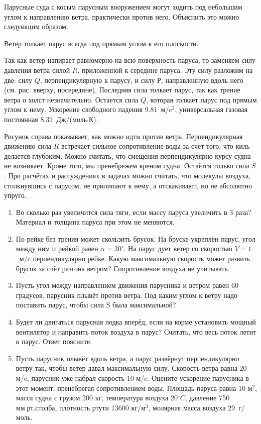 
Парусные суда с косым парусным вооружением могут ходить под небольшим углом к направлению ветра, 
практически против него. Объяснить это можно следующим образом.

Ветер толкает парус всегда под прямым углом к его плоскости.


Так как ветер напирает равномерно на всю поверхность паруса, то заменяем силу давления ветра силой $R$, 
приложенной к середине паруса. Эту силу разложим на две: силу $Q$, перпендикулярную к парусу, и силу $Р$, 
направленную вдоль него (см. рис. вверху, посередине). Последняя сила толкает парус, так как трение 
ветра о холст незначительно. Остается сила $Q$, которая толкает парус под прямым углом к нему. 
Ускорение свободного падения 9.81~м/c$^2$, универсальная газовая постоянная 8.31~Дж/(моль$\cdot$К).

Рисунок справа показывает, как можно идти против ветра. Перпендикулярная движению сила $R$ встречает сильное 
сопротивление воды за счёт того, что киль делается глубоким. Можно считать, что смещения перпендикулярно 
курсу судна не возникает. Кроме того, мы пренебрежем креном судна. Остаётся только сила $S$. При расчётах и 
рассуждениях в задачах можно считать, что молекулы воздуха, столкнувшись с парусом, не прилипают к нему, а 
отскакивают, но не абсолютно упруго.

\begin{enumerate}
    \item Во сколько раз увеличится сила тяги, если массу паруса увеличить в 3 раза? Материал и толщина паруса при этом не меняются.
    \item По рейке без трения может скользить брусок. На бруске укреплён парус, угол между ним и рейкой равен 
    $\alpha = 30^{\circ}$. На парус дует ветер со скоростью \linebreak $V = 1$~м/c перпендикулярно рейке. Какую 
    максимальную скорость может развить брусок за счёт разгона ветром? Сопротивление воздуха не учитывать.


    \item Пусть угол между направлением движения парусника и ветром равен 60 градусов, парусник плывёт против ветра. Под каким углом к ветру надо поставить парус, чтобы сила S была максимальной?
    \item Будет ли двигаться парусная лодка вперёд, если на корме установить мощный вентилятор и направить поток воздуха в парус? Считать, что весь поток летит в парус. Ответ поясните.
    \item Пусть парусник плывёт вдоль ветра, а парус развёрнут перпендикулярно ветру так, чтобы ветер давал 
    максимальную силу.  Скорость ветра равна 20 м/c, парусник уже набрал скорость 10 м/c. Оцените ускорение 
    парусника в этот момент, пренебрегая сопротивлением воды. Площадь паруса равна 10 м$^2$, масса судна с 
    грузом 200 кг, температура воздуха 20$^{\circ}C$, давление 750 мм.рт.столба, плотность ртути 13600 кг/м$^3$, 
    молярная масса воздуха 29~г/моль.
\end{enumerate}